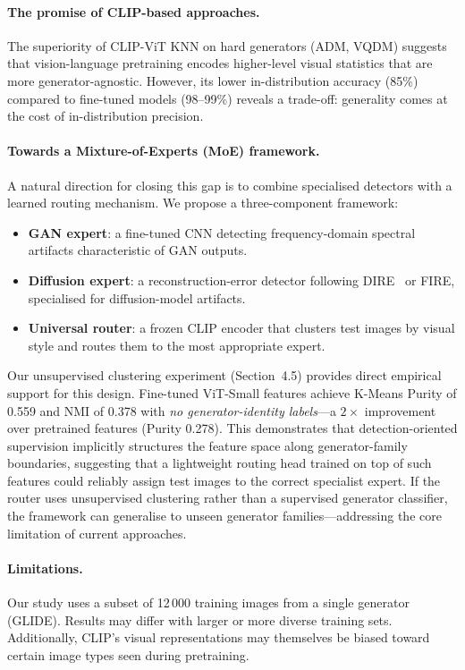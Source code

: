 \documentclass{article}
\begin{document}
\paragraph{The promise of CLIP-based approaches.}
The superiority of CLIP-ViT KNN on hard generators (ADM, VQDM) suggests that vision-language pretraining encodes higher-level visual statistics that are more generator-agnostic.
However, its lower in-distribution accuracy (85\%) compared to fine-tuned models (98--99\%) reveals a trade-off: generality comes at the cost of in-distribution precision.

\paragraph{Towards a Mixture-of-Experts (MoE) framework.}
A natural direction for closing this gap is to combine specialised detectors with a learned routing mechanism.
We propose a three-component framework:
\begin{itemize}
    \item \textbf{GAN expert}: a fine-tuned CNN detecting frequency-domain spectral artifacts characteristic of GAN outputs.
    \item \textbf{Diffusion expert}: a reconstruction-error detector following DIRE~\cite{wang2023dire} or FIRE, specialised for diffusion-model artifacts.
    \item \textbf{Universal router}: a frozen CLIP encoder that clusters test images by visual style and routes them to the most appropriate expert.
\end{itemize}
Our unsupervised clustering experiment (Section~4.5) provides direct empirical support for this design.
Fine-tuned ViT-Small features achieve K-Means Purity of 0.559 and NMI of 0.378 with \emph{no generator-identity labels}—a $2\times$ improvement over pretrained features (Purity 0.278).
This demonstrates that detection-oriented supervision implicitly structures the feature space along generator-family boundaries, suggesting that a lightweight routing head trained on top of such features could reliably assign test images to the correct specialist expert.
If the router uses unsupervised clustering rather than a supervised generator classifier, the framework can generalise to unseen generator families—addressing the core limitation of current approaches.

\paragraph{Limitations.}
Our study uses a subset of 12\,000 training images from a single generator (GLIDE).
Results may differ with larger or more diverse training sets.
Additionally, CLIP's visual representations may themselves be biased toward certain image types seen during pretraining.
\end{document}
